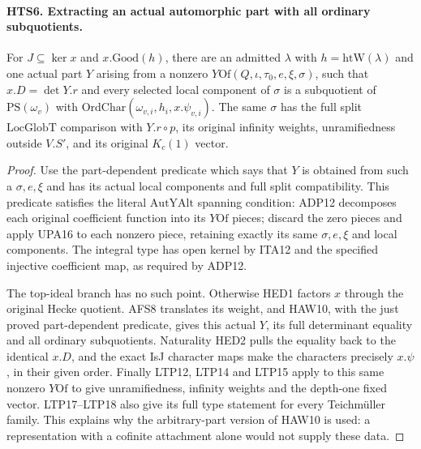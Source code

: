 \documentclass[11pt,a4paper]{article}
\numberwithin{equation}{section}
\theoremstyle{remark}\newtheorem{remark}[theorem]{Remark}
\begin{document}
\paragraph{HTS6. Extracting an actual automorphic part with all ordinary subquotients.}
\label{claim:HTS6}
For $J\subseteq\ker x$ and $x.\mathrm{Good}(h)$, there are an
admitted $\lambda$ with $h=\mathrm{htW}(\lambda)$ and one actual
part $Y$ arising from a nonzero
$Y\mathrm{Of}(Q,\iota,\tau_0,e,\xi,\sigma)$, such that
$x.D=\det Y.r$ and every selected local component of $\sigma$
is a subquotient of $\mathrm{PS}(\omega_v)$ with
$\mathrm{OrdChar}(\omega_{v,i},h_i,x.\psi_{v,i})$.
The same $\sigma$ has the full split $\mathrm{LocGlobT}$
comparison with $Y.r\circ p$, its original infinity weights,
unramifiedness outside $V.S'$, and its original $K_c(1)$ vector.
\begin{proof}
Use the part-dependent predicate which says that $Y$ is obtained
from such a $\sigma,e,\xi$ and has its actual local components
and full split compatibility.  This predicate satisfies the
literal $\mathrm{AutYAlt}$ spanning condition: ADP12 decomposes
each original coefficient function into its $Y\mathrm{Of}$
pieces; discard the zero pieces and apply UPA16 to each nonzero
piece, retaining exactly its same $\sigma,e,\xi$ and local
components.  The integral type has open kernel by ITA12 and
the specified injective coefficient map, as required by ADP12.

The top-ideal branch has no such point.  Otherwise HED1 factors
$x$ through the original Hecke quotient.  AFS8 translates its
weight, and HAW10, with the just proved part-dependent predicate,
gives this actual $Y$, its full determinant equality and all
ordinary subquotients.  Naturality HED2 pulls the equality back
to the identical $x.D$, and the exact IsJ character maps make
the characters precisely $x.\psi$, in their given order.
Finally LTP12, LTP14 and LTP15 apply to this same nonzero
$Y\mathrm{Of}$ to give unramifiedness, infinity weights and
the depth-one fixed vector.  LTP17--LTP18 also give its full
type statement for every Teichm\"uller family.  This explains
why the arbitrary-part version of HAW10 is used: a representation
with a cofinite attachment alone would not supply these data.
\end{proof}

\end{document}
